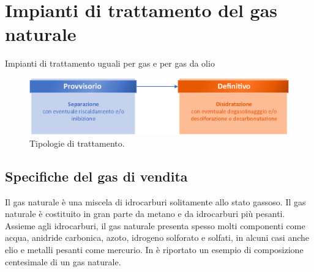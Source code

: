 \clearpage{\pagestyle{empty}\cleardoublepage}
\chapter{Impianti di trattamento del gas naturale}
Impianti di trattamento uguali per gas e per gas da olio

\begin{figure}[htbp]
    \centering
    \includegraphics[width=\textwidth]{fig/impianti/generaltreatment.eps}
    \caption{Tipologie di trattamento.}
    \label{fig:generaltreatment}
\end{figure}

\section{Specifiche del gas di vendita}
Il gas naturale è una miscela di idrocarburi solitamente allo stato gassoso. Il gas naturale è costituito in gran parte da metano e da idrocarburi più pesanti. Assieme agli idrocarburi, il gas naturale presenta spesso molti componenti come acqua, anidride carbonica, azoto, idrogeno solforato e solfati, in alcuni casi anche elio e metalli pesanti come mercurio. In  è riportato un esempio di composizione centesimale di un gas naturale. 


